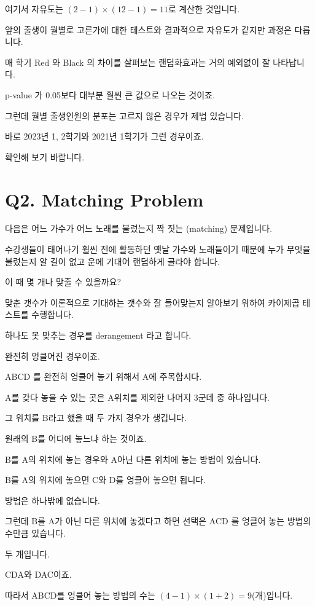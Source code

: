\documentclass[
]{book}
\begin{document}
여기서 자유도는 \((2-1)\times{(12-1) = 11}\)로 계산한 것입니다.

앞의 출생이 월별로 고른가에 대한 테스트와 결과적으로 자유도가 같지만 과정은 다릅니다.

매 학기 Red 와 Black 의 차이를 살펴보는 랜덤화효과는 거의 예외없이 잘 나타납니다.

p-value 가 0.05보다 대부분 훨씬 큰 값으로 나오는 것이죠.

그런데 월별 출생인원의 분포는 고르지 않은 경우가 제법 있습니다.

바로 2023년 1, 2학기와 2021년 1학기가 그런 경우이죠.

확인해 보기 바랍니다.

\section{Q2. Matching Problem}\label{q2.-matching-problem}

다음은 어느 가수가 어느 노래를 불렀는지 짝 짓는 (matching) 문제입니다.

수강생들이 태어나기 훨씬 전에 활동하던 옛날 가수와 노래들이기 때문에 누가 무엇을 불렀는지 알 길이 없고 운에 기대어 랜덤하게 골라야 합니다.

이 때 몇 개나 맞출 수 있을까요?

맞춘 갯수가 이론적으로 기대하는 갯수와 잘 들어맞는지 알아보기 위하여 카이제곱 테스트를 수행합니다.

하나도 못 맞추는 경우를 derangement 라고 합니다.

완전히 엉클어진 경우이죠.

ABCD 를 완전히 엉클어 놓기 위해서 A에 주목합시다.

A를 갖다 놓을 수 있는 곳은 A위치를 제외한 나머지 3군데 중 하나입니다.

그 위치를 B라고 했을 때 두 가지 경우가 생깁니다.

원래의 B를 어디에 놓느냐 하는 것이죠.

B를 A의 위치에 놓는 경우와 A아닌 다른 위치에 놓는 방법이 있습니다.

B를 A의 위치에 놓으면 C와 D를 엉클어 놓으면 됩니다.

방법은 하나밖에 없습니다.

그런데 B를 A가 아닌 다른 위치에 놓겠다고 하면 선택은 ACD 를 엉클어 놓는 방법의 수만큼 있습니다.

두 개입니다.

CDA와 DAC이죠.

따라서 ABCD를 엉클어 놓는 방법의 수는 \((4 - 1)\times(1 + 2) = 9\)(개)입니다.
\end{document}

